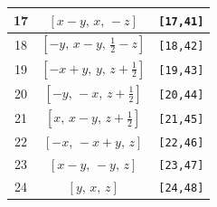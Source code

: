 \documentclass[fleqn,8pt]{jsarticle}
\begin{document}
\begin{longtable}{ccc}
17 & $\left[ x - y,\, x,\, - z \right]$ & {\tt [17,41]} \\ \hline
18 & $\left[ - y,\, x - y,\, \frac{1}{2} - z \right]$ & {\tt [18,42]} \\ \hline
19 & $\left[ - x + y,\, y,\, z + \frac{1}{2} \right]$ & {\tt [19,43]} \\ \hline
20 & $\left[ - y,\, - x,\, z + \frac{1}{2} \right]$ & {\tt [20,44]} \\ \hline
21 & $\left[ x,\, x - y,\, z + \frac{1}{2} \right]$ & {\tt [21,45]} \\ \hline
22 & $\left[ - x,\, - x + y,\, z \right]$ & {\tt [22,46]} \\ \hline
23 & $\left[ x - y,\, - y,\, z \right]$ & {\tt [23,47]} \\ \hline
24 & $\left[ y,\, x,\, z \right]$ & {\tt [24,48]} \\
\end{longtable}
\end{document}
